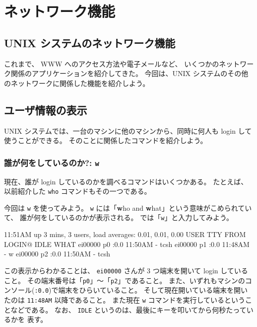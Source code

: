 \chapter{ネットワーク機能}

\section*{UNIX システムのネットワーク機能}

これまで、 WWW へのアクセス方法や電子メールなど、
いくつかのネットワーク関係のアプリケーションを紹介してきた。
今回は、UNIX システムのその他のネットワークに関係した機能を紹介しよう。

\section{ユーザ情報の表示}

 UNIX システムでは、一台のマシンに他のマシンから、同時に何人も login して
使うことができる。
そのことに関係したコマンドを紹介しよう。

\subsection{誰が何をしているのか?: \texttt{w}}

現在、誰が login しているのかを調べるコマンドはいくつかある。
たとえば、以前紹介した \texttt{who} コマンドもその一つである。

今回は \texttt{w} を使ってみよう。
\texttt{w} には「\textbf{w}ho and \textbf{w}hat」という意味がこめられていて、
誰が何をしているのかが表示される。
では「\texttt{w}」と入力してみよう。

\begin{progls}
11:51AM  up 3 mins, 3 users, load averages: 0.01, 0.01, 0.00
USER             TTY      FROM              LOGIN@  IDLE WHAT
ei00000          p0       :0.0             11:50AM     - tcsh
ei00000          p1       :0.0             11:48AM     - w
ei00000          p2       :0.0             11:50AM     - tcsh
%
\end{progls}

この表示からわかることは、 \texttt{ei00000} さんが 3 つ端末を開いて
login していること。
その端末番号は「\texttt{p0}」〜「\texttt{p2}」であること。
また、いずれもマシンのコンソール(\texttt{:0.0})で端末をひらいていること。
そして現在開いている端末を開いたのは \texttt{11:48AM} 以降であること。
また現在 \texttt{w} コマンドを実行しているということなどである。
なお、 \texttt{IDLE} というのは、最後にキーを叩いてから何秒たっているかを
表す。

